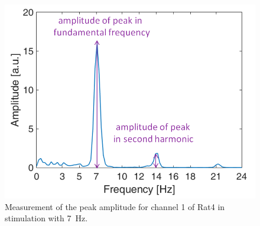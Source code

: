 \documentclass{pracalicmgr}
\begin{document}
	\begin{figure}[H]
	\centering
	\includegraphics[scale=0.5]{pik_widmo2.png}
	\caption{Measurement of the peak amplitude for channel 1 of Rat4 in stimulation with 7~Hz.}
	\label{rys:pik_widmo}
	\end{figure}

    
\end{document}
